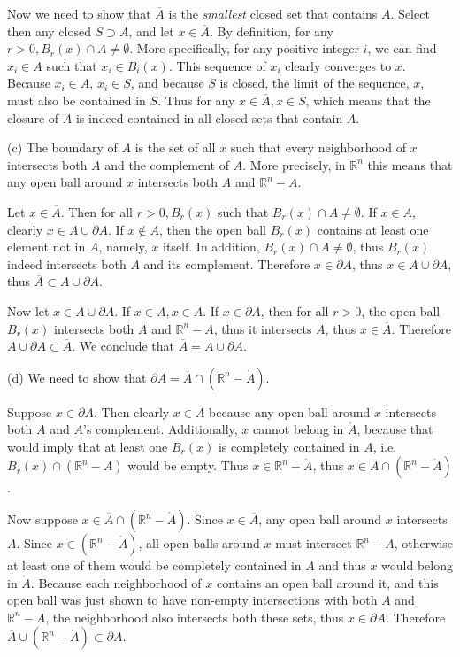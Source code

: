 \begin{solution}
    Now we need to show that $\overline{A}$ is the \textit{smallest} closed set that contains $A$. Select then any closed $S \supset A$, and let $x \in \overline{A}$. By definition, for any $r > 0, B_r(x) \cap A \neq \emptyset$. More specifically, for any positive integer $i$, we can find $x_i \in A$ such that $x_i \in B_i(x)$. This sequence of $x_i$ clearly converges to $x$. Because $x_i \in A$, $x_i \in S$, and because $S$ is closed, the limit of the sequence, $x$, must also be contained in $S$. Thus for any $x \in \overline{A}, x \in S$, which means that the closure of $A$ is indeed contained in all closed sets that contain $A$.

    (c) The boundary of $A$ is the set of all $x$ such that every neighborhood of $x$ intersects both $A$ and the complement of $A$. More precisely, in $\mathbb{R}^n$ this means that any open ball around $x$ intersects both $A$ and $\mathbb{R}^n - A$.

    Let $x \in \overline{A}$. Then for all $r > 0, B_r(x)$ such that $B_r(x) \cap A \neq \emptyset$. If $x \in A$, clearly $x \in A \cup \partial{A}$. If $x \notin A$, then the open ball $B_r(x)$ contains at least one element not in $A$, namely, $x$ itself. In addition, $B_r(x) \cap A \neq \emptyset$, thus $B_r(x)$ indeed intersects both $A$ and its complement. Therefore $x \in \partial{A}$, thus $x \in A \cup \partial{A}$, thus $\overline{A} \subset A \cup \partial{A}$.

    Now let $x \in A \cup \partial{A}$. If $x \in A, x \in \overline{A}$. If $x \in \partial{A}$, then for all $r > 0$, the open ball $B_r(x)$ intersects both $A$ and $\mathbb{R}^n - A$, thus it intersects $A$, thus $x \in \overline{A}$. Therefore $A \cup \partial{A} \subset \overline{A}$. We conclude that $\overline{A} = A \cup \partial{A}$.

    (d) We need to show that $\partial{A} = \overline{A} \cap (\mathbb{R}^n - \mathring{A})$. 
    
    Suppose $x \in \partial{A}$. Then clearly $x \in \overline{A}$ because any open ball around $x$ intersects both $A$ and $A$'s complement. Additionally, $x$ cannot belong in $\mathring{A}$, because that would imply that at least one $B_r(x)$ is completely contained in $A$, i.e.\ $B_r(x) \cap (\mathbb{R}^n - A)$ would be empty. Thus $x \in \mathbb{R}^n - \mathring{A}$, thus $x \in \overline{A} \cap (\mathbb{R}^n - \mathring{A})$.

    Now suppose $x \in \overline{A} \cap (\mathbb{R}^n - \mathring{A})$. Since $x \in \overline{A}$, any open ball around $x$ intersects $A$. Since $x \in (\mathbb{R}^n - \mathring{A})$, all open balls around $x$ must intersect $\mathbb{R}^n - A$, otherwise at least one of them would be completely contained in $A$ and thus $x$ would belong in $\mathring{A}$. Because each neighborhood of $x$ contains an open ball around it, and this open ball was just shown to have non-empty intersections with both $A$ and $\mathbb{R}^n - A$, the neighborhood also intersects both these sets, thus $x \in \partial{A}$. Therefore $\overline{A} \cup (\mathbb{R}^n - \mathring{A}) \subset \partial{A}$.


\end{solution}
